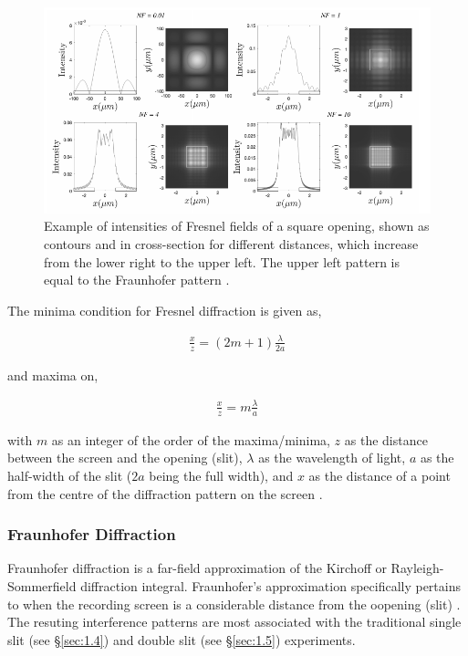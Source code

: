 \documentclass[12pt]{article}
\begin{document}
\begin{figure}[H]
    \centering
    \includegraphics[width=.85\textwidth]{fresnel patterns.png}
    \caption{Example of intensities of Fresnel fields of a square opening, shown as contours and in cross-section for different distances, which increase from the lower right to the upper left.
    The upper left pattern is equal to the Fraunhofer pattern \protect\cite{fresnelfraunhofer}.}
    \label{fig:2}
\end{figure}

The minima condition for Fresnel diffraction is given as,

\vspace{-2ex}
\begin{gather*}
    \frac{x}{z} = (2m + 1) \frac{\lambda}{2a}
\end{gather*}

and maxima on,

\vspace{-2ex}
\begin{gather*}
    \frac{x}{z} = m \frac{\lambda}{a}
\end{gather*}

with $m$ as an integer of the order of the maxima/minima, $z$ as the distance between the screen and the opening (slit), $\lambda$ as the wavelength of light, $a$ as the half-width of the slit ($2a$ being the full width),
and $x$ as the distance of a point from the centre of the diffraction pattern on the screen \cite{fresnelfraunhofer}.

\subsubsection{Fraunhofer Diffraction}

Fraunhofer diffraction is a far-field approximation of the Kirchoff or Rayleigh-Sommerfield diffraction integral. Fraunhofer's approximation specifically pertains to when the recording screen is a considerable distance from the oopening (slit) \cite{fresnelfraunhofer}.
The resuting interference patterns are most associated with the traditional single slit (see §\ref{sec:1.4}) and double slit (see §\ref{sec:1.5}) experiments.
\end{document}
